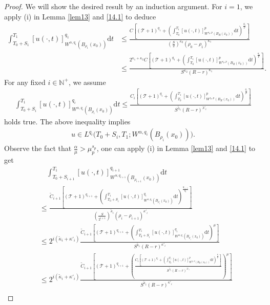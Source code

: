 \documentclass[reqno,10pt]{amsart}
\numberwithin{equation}{section}
\begin{document}
\begin{proof}
	We will show the desired result by an induction argument. For $i=1$, we apply (i) in Lemma \ref{lem13} and \eqref{14.1} to deduce
	\begin{align*}
		\int_{T_0+S_1}^{T_1}[u(\cdot,t)]^{q_1}_{W^{\alpha,q_1}\left( B_{\rho_1}(x_0)\right) }\mathrm{d}t&\le\frac{C\left[\left(\mathcal{T}+1\right)^{q_1}+\left( \int_{T_0}^{T_1}[u(\cdot,t)]^p_{W^{s_p,p}\left( B_R(x_0)\right)}\mathrm{d}t\right)^{\frac{q_1}{p}}\right]}{\left( \frac{S}{2}\right) ^{\kappa_2}(\rho_0-\rho_1)^{\kappa_1}}\nonumber\\
		&\le \frac{2^{\kappa_1+\kappa_2}C\left[\left(\mathcal{T}+1\right)^{q_1}+\left( \int_{T_0}^{T_1}[u(\cdot,t)]^p_{W^{s_p,p}\left( B_R(x_0)\right)}\mathrm{d}t\right)^{\frac{q_1}{p}}\right]}{S ^{\kappa_2}(R-r)^{\kappa_1}}.
	\end{align*}
	For any fixed $i\in\mathbb{N}^+$, we assume
	\begin{align}
		\label{14.2}
		\int_{T_0+S_i}^{T_1}[u(\cdot,t)]^{q_i}_{W^{\alpha,q_i}\left( B_{\rho_i}(x_0)\right) }\mathrm{d}t
		\le \frac{C_i\left[\left(\mathcal{T}+1\right)^{q_i}+\left( \int_{T_0}^{T_1}[u(\cdot,t)]^p_{W^{s_p,p}\left( B_R(x_0)\right)}\mathrm{d}t\right)^{\frac{q_i}{p}}\right]}{S ^{\tilde{\lambda}_i}(R-r)^{\lambda'_i}}
	\end{align}
	holds true. The above inequality implies
	\begin{align*}
		u\in L^{q_i}\bigl(T_0+S_i,T_1;W^{\alpha,q_i}\left(B_{\rho_i}(x_0)\right)\bigl).
	\end{align*}
	Observe the fact that $\frac{\alpha}{\mu}>\mu^{s_p}_p$, one can apply (i) in Lemma \ref{lem13} and \eqref{14.1} to get
	\begin{align*}
		&\quad\int_{T_0+S_{i+1}}^{T_1}[u(\cdot,t)]^{q_{i+1}}_{W^{\alpha,q_{i+1}}\left( B_{\rho_{i+1}}(x_0)\right) }\mathrm{d}t\\
		&\le \frac{\widetilde{C}_{i+1}\left[\left(\mathcal{T}+1\right)^{q_{i+1}}+\left( \int_{T_0+S_{i}}^{T_1}[u(\cdot,t)]^{q_i}_{W^{\alpha,q_i}\left( B_{\rho_i}(x_0)\right)}\mathrm{d}t\right)^{\frac{q_{i+1}}{q_i}}\right]}{\left(\frac{S}{2^{i+1}}\right)  ^{\tilde{\kappa}_i}(\rho_{i}-\rho_{i+1})^{\kappa'_i}}\\
		&\le 2^{i(\tilde{\kappa}_i+\kappa'_i)}\frac{\widetilde{C}_{i+1}\left[\left(\mathcal{T}+1\right)^{q_{i+1}}+\left( \int_{T_0+S_{i}}^{T_1}[u(\cdot,t)]^{q_i}_{W^{\alpha,q_i}\left( B_{\rho_i}(x_0)\right)}\mathrm{d}t\right)^{\mu}\right]}{S  ^{\tilde{\kappa}_i}(R-r)^{\kappa'_i}}\\
		&\le 2^{i(\tilde{\kappa}_i+\kappa'_i)}\frac{\widetilde{C}_{i+1}\left[\left(\mathcal{T}+1\right)^{q_{i+1}}+\left( \frac{C_i\left[\left(\mathcal{T}+1\right)^{q_i}+\left( \int_{T_0}^{T_1}[u(\cdot,t)]^p_{W^{s_p,p}\left( B_R(x_0)\right)}\mathrm{d}t\right)^{\frac{q_i}{p}}\right]}{S ^{\tilde{\lambda}_i}(R-r)^{\lambda'_i}}\right)^{\mu}\right]}{S  ^{\tilde{\kappa}_i}(R-r)^{\kappa'_i}}\\

\end{align*}
\end{proof}
\end{document}
